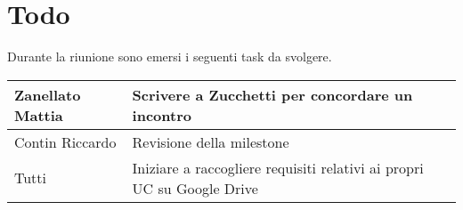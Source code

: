 \section{Todo}
Durante la riunione sono emersi i seguenti task da svolgere.

\begin{center}
  \begin{tabular}{|p{5cm}|p{7cm}|}
    \hline
    Zanellato Mattia & Scrivere a Zucchetti per concordare un incontro \\ \hline
    Contin Riccardo & Revisione della milestone \\ \hline
    Tutti & Iniziare a raccogliere requisiti relativi ai propri UC su Google Drive \\ \hline
  \end{tabular}
\end{center}
